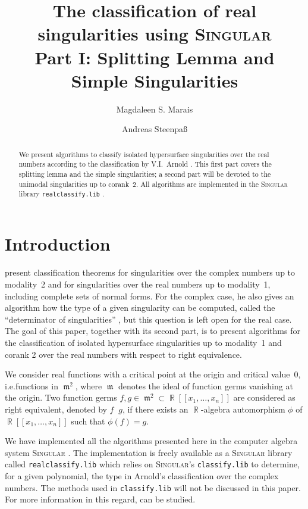 \documentclass[noend]{amsproc}
\title[The classification of real singularities using \textsc{Singular}, %
Part I]%
{The classification of real singularities using \textsc{Singular}\\
Part I: Splitting Lemma and Simple Singularities}
\author{Magdaleen S. Marais}
\author{Andreas Steenpa\ss}
\theoremstyle{definition}
\newcommand{\Singular}{\textsc{Singular}}
\newcommand{\realclassify}{\texttt{realclassify.lib}}
\newcommand{\classify}{\texttt{classify.lib}}
\DeclareMathOperator{\requiv}{\overset{r}{\sim}}
\DeclareMathOperator{\m}{\mathfrak{m}}
\DeclareMathOperator{\R}{\mathbb{R}}
\begin{document}
\begin{abstract}
We present algorithms to classify isolated hypersurface singularities over the
real numbers according to the classification by V.I.~Arnold \citep{AVG1985}.
This first part covers the splitting lemma and the simple singularities; a
second part will be devoted to the unimodal singularities up to corank~2.
All algorithms are implemented in the \Singular{} library \realclassify{}
\citep{realclassify}.
\end{abstract}

\maketitle


\section{Introduction}
\citet{AVG1985} present classification theorems for
singularities over the complex numbers up to modality~2 and for singularities
over the real numbers up to modality~1, including complete sets of normal
forms. For the complex case, he also gives an algorithm how the type of a given
singularity can be computed, called the ``determinator of singularities''
\citep[cf.\@][ch.~16]{AVG1985}, but this question is left open for the real
case.
The goal of this paper, together with its second part, is to present algorithms
for the classification of isolated hypersurface singularities up to modality~1
and corank 2 over the real numbers with respect to right equivalence.

We consider real functions with a critical point at the origin and critical
value~$0$, i.e.\@ functions in $\m^2$, where $\m$ denotes the ideal of function
germs vanishing at the origin. Two function germs $f, g \in \m^2 \subset
\R[[x_1,\ldots,x_n]]$ are considered as right equivalent, denoted by
$f \requiv g$, if there exists an $\R$-algebra automorphism $\phi$ of
$\R[[x_1,\ldots,x_n]]$ such that $\phi(f) = g$.

We have implemented all the algorithms presented here in the computer algebra
system \Singular{} \citep{DGPS}. The implementation is freely available as a
\Singular{} library called \realclassify{} which relies on \Singular's
\classify{} to determine, for a given polynomial, the type in Arnold's
classification over the complex numbers. The methods used in \classify{} will
not be discussed in this paper. For more information in this regard,
\citet{Kruger} can be studied.
\end{document}
